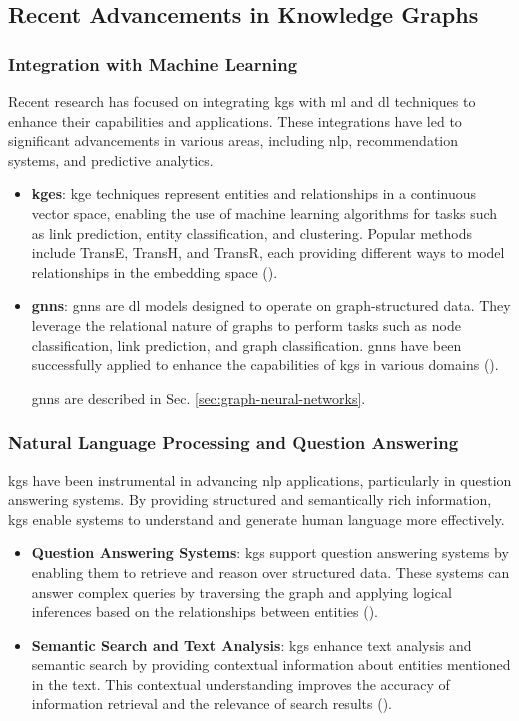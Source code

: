 \subsection*{Recent Advancements in Knowledge Graphs}

\subsubsection*{Integration with Machine Learning}
Recent research has focused on integrating \glspl{kg} with \gls{ml} and \gls{dl} techniques to enhance their capabilities and applications. These integrations have led to significant advancements in various areas, including \gls{nlp}, recommendation systems, and predictive analytics.
\begin{itemize}
    \item \textbf{\glspl{kge}}: \gls{kge} techniques represent entities and relationships in a continuous vector space, enabling the use of machine learning algorithms for tasks such as link prediction, entity classification, and clustering. Popular methods include TransE, TransH, and TransR, each providing different ways to model relationships in the embedding space (\cite{Wang2017}).
    \item \textbf{\glspl{gnn}}: \glspl{gnn} are \gls{dl} models designed to operate on graph-structured data. They leverage the relational nature of graphs to perform tasks such as node classification, link prediction, and graph classification. \glspl{gnn} have been successfully applied to enhance the capabilities of \glspl{kg} in various domains (\cite{Wu2021}).
    
    \glspl{gnn} are described in Sec. \ref{sec:graph-neural-networks}.
\end{itemize}

\subsubsection*{Natural Language Processing and Question Answering}
\glspl{kg} have been instrumental in advancing \gls{nlp} applications, particularly in question answering systems. By providing structured and semantically rich information, \glspl{kg} enable systems to understand and generate human language more effectively.
\begin{itemize}
    \item \textbf{Question Answering Systems}: \glspl{kg} support question answering systems by enabling them to retrieve and reason over structured data. These systems can answer complex queries by traversing the graph and applying logical inferences based on the relationships between entities (\cite{Yasunaga2021}).
    \item \textbf{Semantic Search and Text Analysis}: \glspl{kg} enhance text analysis and semantic search by providing contextual information about entities mentioned in the text. This contextual understanding improves the accuracy of information retrieval and the relevance of search results (\cite{Fernandez2011}).
\end{itemize}

